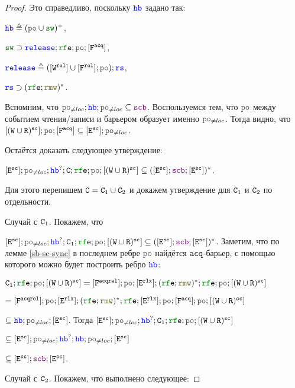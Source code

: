 \begin{proof}
  
  \canceloffset Это справедливо, поскольку $\lHB$ задано так: 

  $\lHB \defeq (\lPO \cup \lSW)^{+}$,

  $\lSW \supset \mathtt{\color{blue}release};\lRFE;\lPO;[\lF^{\acq}]$,

  $\mathtt{\color{blue}release} \defeq ([\lW^{\rel}] \cup [\lF^{\rel}];\lPO);\mathtt{\color{blue}rs}$,

  $\mathtt{\color{blue}rs} \supset (\lRFE;\lRMW)^{*}$.

  Вспомним, что $\lPO_{\neq loc} ; \lHB ; \lPO_{\neq loc} \subseteq \lSCB$. Воспользуемся тем, что $\lPO$ между событием чтения/записи и барьером образует именно $\lPO_{\neq loc}$. Тогда видно, что $[(\lW \cup \lR)^{\sco}]; \lPO; [\lF^{\acq}] \subseteq [\lE^{\sco}]; \lPO_{\neq loc}$.

  Остаётся доказать следующее утверждение:

  $[\lE^{\sco}]; \lPO_{\neq loc} ; \lHB^?; \CA; \lRFE; \lPO ; [(\lW \cup \lR)^{\sco}] \subseteq  ([\lE^{\sco}] ; \lSCB ; [\lE^{\sco}])^{*}$.

  Для этого перепишем $\mathtt{C}=\mathtt{C}_1 \cup \mathtt{C}_2$ и докажем утверждение для $\mathtt{C}_1$ и $\mathtt{C}_2$ по отдельности. 

  
  Случай с $\mathtt{C}_1$. Покажем, что

  $[\lE^{\sco}]; \lPO_{\neq loc} ; \lHB^?; \CA_1; \lRFE; \lPO ; [(\lW \cup \lR)^{\sco}]\subseteq  ([\lE^{\sco}] ; \lSCB ; [\lE^{\sco}])^{*}$.
Заметим, что по лемме \ref{sb-sc-sync}   в последнем ребре $\lPO$ найдётся ${\mathtt{acq}}$-барьер, с помощью которого можно будет построить ребро $\lHB$:

    $\CA_1; \lRFE; \lPO ; [(\lW \cup \lR)^{\sco}] = [\Far] ; \lPO ; [\lE^{\rlx}] ; (\lRFE ; \lRMW)^{*}; \lRFE; \lPO ; [(\lW \cup \lR)^{\sco}]$

    $= [\Far] ; \lPO ; [\lE^{\rlx}] ; (\lRFE ; \lRMW)^{*}; \lRFE; [\lE^{\rlx}]; \lPO; [\Fa]; \lPO ; [(\lW \cup \lR)^{\sco}]$

    $\subseteq \lHB; \lPO_{\neq loc}; [\lE^{\sco}]$.  Тогда $[\lE^{\sco}]; \lPO_{\neq loc} ; \lHB^?; \CA_1; \lRFE; \lPO ; [(\lW \cup \lR)^{\sco}]$

    $\subseteq [\lE^{\sco}]; \lPO_{\neq loc} ; \lHB^?; \lHB; \lPO_{\neq loc}; [\lE^{\sco}]$

    $\subseteq [\lE^{\sco}] ; \lSCB ; [\lE^{\sco}]$.

    \vspace{1em}
    
    Случай с $\mathtt{C}_2$. Покажем, что выполнено следующее:


\end{proof}
